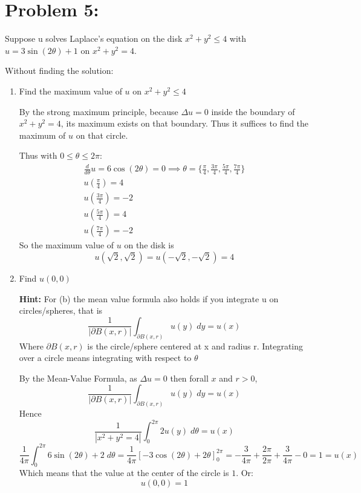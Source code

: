 \documentclass[12pt]{article}
\begin{document}
\pagebreak

\section*{Problem 5:} Suppose u solves Laplace's equation
on the disk $x^2 + y^2 \leq 4$ with $u = 3 \sin(2\theta) + 1$ on $x^2 + y^2 = 4$.

Without finding the solution:
\begin{enumerate}
    \item Find the maximum value of $u$ on $x^2 + y^2 \leq 4$
    
    \color{blue}
    By the strong maximum principle, because $\Delta u =0$ inside the boundary of $x^2 + y^2 = 4$, its maximum exists on that boundary. Thus it suffices to find the maximum of $u$ on that circle. 

    Thus with $0 \leq \theta \leq 2\pi$:
    \begin{gather*}
        \frac{d}{d\theta} u = 6\cos(2\theta) = 0 \implies \theta = \{\frac{\pi}{4}, \frac{3\pi}{4}, \frac{5\pi}{4}, \frac{7\pi}{4}\}\\
        u(\frac{\pi}{4}) = 4\\
        u(\frac{3\pi}{4}) = -2\\
        u(\frac{5\pi}{4}) = 4\\
        u(\frac{7\pi}{4}) = -2
    \end{gather*}
    So the maximum value of $u$ on the disk is 
    \[\boxed{u(\sqrt{2}, \sqrt{2}) = u(-\sqrt{2}, -\sqrt{2}) = 4}\]
    \color{black}

    \item Find $u(0,0)$
    
    \textbf{Hint:} For (b) the mean value formula also holds if you integrate u on circles/spheres, that is
    \[\frac{1}{|\partial B(x, r)|} \int_{\partial B(x, r)} u(y) \; dy = u(x)\]
    Where $\partial B(x, r)$ is the circle/sphere centered at x and radius r. Integrating over a circle means integrating with respect to $\theta$

    \color{blue}
    By the Mean-Value Formula, as $\Delta u=0$ then forall $x$ and $r > 0$,
    \[\frac{1}{|\partial B(x, r)|} \int_{\partial B(x, r)} u(y) \; dy = u(x)\]
    Hence 
    \[\frac{1}{|x^2 + y^2 = 4|} \int_0^{2\pi} 2u(y)\; d\theta = u(x)\]
    \[\frac{1}{4\pi}\int_0^{2\pi} 6\sin(2\theta) + 2\; d\theta = \frac{1}{4\pi}[-3\cos(2\theta) + 2\theta]_0^{2\pi} = -\frac{3}{4\pi} + \frac{2\pi}{2\pi} + \frac{3}{4\pi} - 0 = 1 = u(x)\]
    Which means that the value at the center of the circle is $1$. Or:
    \[\boxed{u(0,0) = 1}\]
    \color{black}
\end{enumerate}
\end{document}
